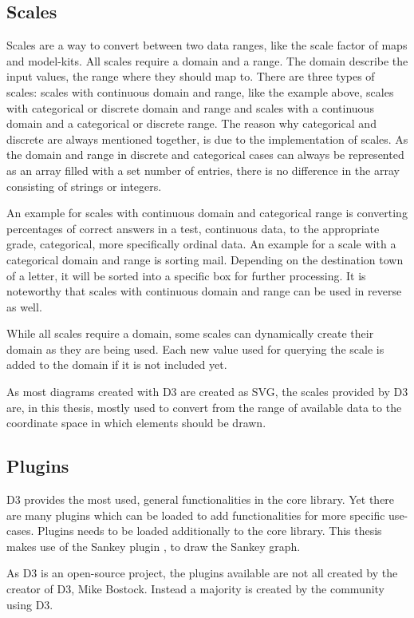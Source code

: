 \subsection{Scales}

Scales are a way to convert between two data ranges, like the scale factor of maps and model-kits. All scales require a domain and a range. The domain describe the input values, the range where they should map to.
There are three types of scales: scales with continuous domain and range, like the example above, scales with categorical or discrete domain and range and scales with a continuous domain and a categorical or discrete range. The reason why categorical and discrete are always mentioned together, is due to the implementation of scales. As the domain and range in discrete and categorical cases can always be represented as an array filled with a set number of entries, there is no difference in the array consisting of strings or integers.

An example for scales with continuous domain and categorical range is converting percentages of correct answers in a test, continuous data, to the appropriate grade, categorical, more specifically ordinal data. An example for a scale with a categorical domain and range is sorting mail. Depending on the destination town of a letter, it will be sorted into a specific box for further processing.
It is noteworthy that scales with continuous domain and range can be used in reverse as well.

While all scales require a domain, some scales can dynamically create their domain as they are being used. Each new value used for querying the scale is added to the domain if it is not included yet.

As most diagrams created with D3 are created as SVG, the scales provided by D3 are, in this thesis, mostly used to convert from the range of available data to the coordinate space in which elements should be drawn.

\subsection{Plugins}

D3 provides the most used, general functionalities in the core library. Yet there are many plugins which can be loaded to add functionalities for more specific use-cases. Plugins needs to be loaded additionally to the core library. This thesis makes use of the Sankey plugin \cite{Sankey_package}, to draw the Sankey graph.

As D3 is an open-source project, the plugins available are not all created by the creator of D3, Mike Bostock. Instead a majority is created by the community using D3.
